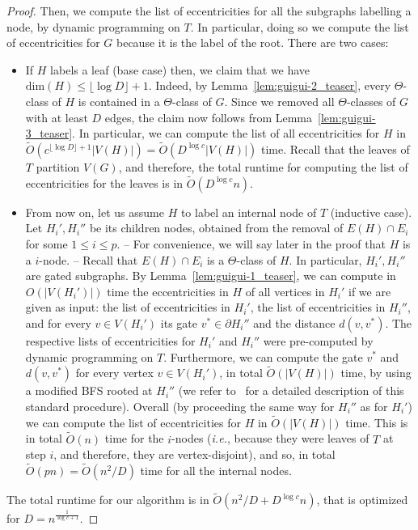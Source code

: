 \documentclass[a4paper,UKenglish,numberwithinsect,cleveref, autoref]{lipics-v2021}
\begin{document}
\begin{proof}
Then, we compute the list of eccentricities for all the subgraphs labelling a node, by dynamic programming on $T$. 
In particular, doing so we compute the list of eccentricities for $G$ because it is the label of the root.
There are two cases:
\begin{itemize}
    \item If $H$ labels a leaf (base case) then, we claim that we have $\mbox{dim}(H) \leq \lfloor \log{D} \rfloor + 1$.
Indeed, by Lemma~\ref{lem:guigui-2_teaser}, every $\Theta$-class of $H$ is contained in a $\Theta$-class of $G$.
Since we removed all $\Theta$-classes of $G$ with at least $D$ edges, the claim now follows from Lemma~\ref{lem:guigui-3_teaser}.
In particular, we can compute the list of all eccentricities for $H$ in $\tilde{O}(c^{\lfloor \log{D} \rfloor + 1}|V(H)|) = \tilde{O}(D^{\log{c}}|V(H)|)$ time.
Recall that the leaves of $T$ partition $V(G)$, and therefore, the total runtime for computing the list of eccentricities for the leaves is in $\tilde{O}(D^{\log{c}}n)$.
    \item From now on, let us assume $H$ to label an internal node of $T$ (inductive case).
Let $H_i',H_i''$ be its children nodes, obtained from the removal of $E(H) \cap E_i$ for some $1 \leq i \leq p$.
-- For convenience, we will say later in the proof that $H$ is a $i$-node. --
Recall that $E(H) \cap E_i$ is a $\Theta$-class of $H$.
In particular, $H_i',H_i''$ are gated subgraphs.
By Lemma~\ref{lem:guigui-1_teaser}, we can compute in ${O}(|V(H_i')|)$ time the eccentricities in $H$ of all vertices in $H_i'$ if we are given as input: the list of eccentricities in $H_i'$, the list of eccentricities in $H_i''$, and for every $v \in V(H_i')$ its gate $v^* \in \partial H_i''$ and the distance $d(v,v^*)$. 
The respective lists of eccentricities for $H_i'$ and $H_i''$ were pre-computed by dynamic programming on $T$.
Furthermore, we can compute the gate $v^*$ and $d(v,v^*)$ for every vertex $v \in V(H_i')$, in total $\tilde{O}(|V(H)|)$ time, by using a modified BFS rooted at $H_i''$ (we refer to~\cite[Lemma 17]{ChLaRa19} for a detailed description of this standard procedure).
Overall (by proceeding the same way for $H_i''$ as for $H_i'$) we can compute the list of eccentricities for $H$ in $\tilde{O}(|V(H)|)$ time.
This is in total $\tilde{O}(n)$ time for the $i$-nodes ({\it i.e.}, because they were leaves of $T$ at step $i$, and therefore, they are vertex-disjoint), and so, in total $\tilde{O}(pn) = \tilde{ O}(n^2/D)$ time for all the internal nodes.
\end{itemize}
The total runtime for our algorithm is in $\tilde{O}(n^2/D + D^{\log{c}}n)$, that is optimized for $D = n^{\frac 1 {\log{c}+1}}$.
\end{proof}
\end{document}
